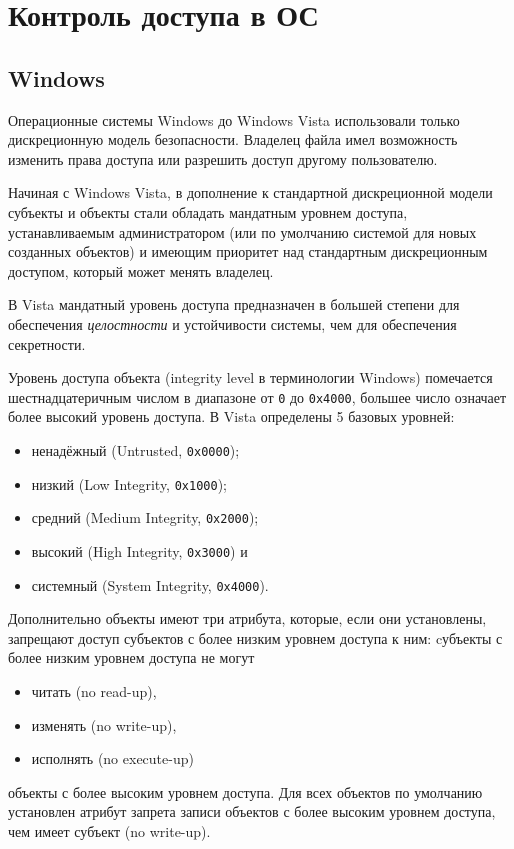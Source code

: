 \section{Контроль доступа в ОС}

\subsection{Windows}

Операционные системы Windows до Windows Vista использовали только дискреционную модель безопасности. Владелец файла имел возможность изменить права доступа или разрешить доступ другому пользователю.

Начиная с Windows Vista, в дополнение к стандартной дискреционной модели субъекты и объекты стали обладать мандатным уровнем доступа, устанавливаемым администратором (или по умолчанию системой для новых созданных объектов) и имеющим приоритет над стандартным дискреционным доступом, который может менять владелец.

В Vista мандатный уровень доступа предназначен в большей степени для обеспечения \emph{целостности} и устойчивости системы, чем для обеспечения секретности.

Уровень доступа объекта (integrity level в терминологии Windows) помечается шестнадцатеричным числом в диапазоне от \texttt{0} до \texttt{0x4000}, большее число означает более высокий уровень доступа. В Vista определены 5 базовых уровней:
\begin{itemize}
    \item ненадёжный (Untrusted, \texttt{0x0000});
    \item низкий (Low Integrity, \texttt{0x1000});
    \item средний (Medium Integrity, \texttt{0x2000});
    \item высокий (High Integrity, \texttt{0x3000}) и
    \item системный (System Integrity, \texttt{0x4000}).
\end{itemize}

Дополнительно объекты имеют три атрибута, которые, если они установлены, запрещают доступ субъектов с более низким уровнем доступа к ним: cубъекты с более низким уровнем доступа не могут
\begin{itemize}
    \item читать (no read-up),
    \item изменять (no write-up),
    \item исполнять (no execute-up)
\end{itemize}
объекты с более высоким уровнем доступа. Для всех объектов по умолчанию установлен атрибут запрета записи объектов с более высоким уровнем доступа, чем имеет субъект (no write-up).

